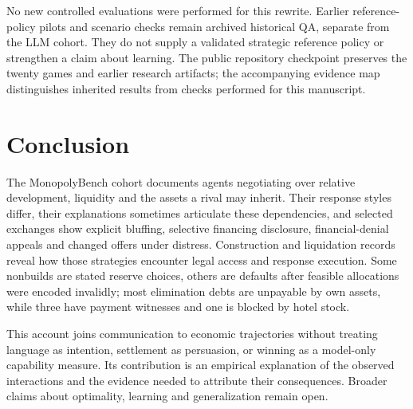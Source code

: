No new controlled evaluations were performed for this rewrite. Earlier reference-policy pilots and scenario checks remain archived historical QA, separate from the LLM cohort. They do not supply a validated strategic reference policy or strengthen a claim about learning. The public repository checkpoint preserves the twenty games and earlier research artifacts; the accompanying evidence map distinguishes inherited results from checks performed for this manuscript.

\section{Conclusion}

The MonopolyBench cohort documents agents negotiating over relative development, liquidity and the assets a rival may inherit. Their response styles differ, their explanations sometimes articulate these dependencies, and selected exchanges show explicit bluffing, selective financing disclosure, financial-denial appeals and changed offers under distress. Construction and liquidation records reveal how those strategies encounter legal access and response execution. Some nonbuilds are stated reserve choices, others are defaults after feasible allocations were encoded invalidly; most elimination debts are unpayable by own assets, while three have payment witnesses and one is blocked by hotel stock.

This account joins communication to economic trajectories without treating language as intention, settlement as persuasion, or winning as a model-only capability measure. Its contribution is an empirical explanation of the observed interactions and the evidence needed to attribute their consequences. Broader claims about optimality, learning and generalization remain open.
